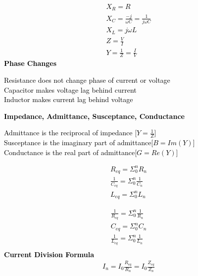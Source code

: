 \documentclass[a4paper,8pt]{extarticle} %
\newcommand{\mybox}[2]{
    \begin{tcolorbox}[colback=lightblue!5!white,colframe=lightblue!75!black,boxsep=1pt,arc=0pt,outer arc=0pt,title={\textcolor{black}{#1}}]
        \textcolor{black}{#2}
    \end{tcolorbox}
}
\begin{document}
\fontsize{7pt}{8pt}\selectfont

\begin{multicols}{2}

\mybox{Impedance}{
    \begin{subequations}
    \begin{align} 
    X_R = R \\
    X_C = \frac{-j}{\omega C} = \frac{1}{j\omega C}\\
    X_L = j\omega L\\
Z = \frac{V}{I}\\
Y = \frac{1}{Z} = \frac{I}{V}
    \end{align}
    \end{subequations}
    \textbf{Phase Changes}
    \begin{center}
        Resistance does not change phase of current or voltage\\
        Capacitor makes voltage lag behind current\\
        Inductor makes current lag behind voltage
    \end{center}
    \textbf{Impedance, Admittance, Susceptance, Conductance}
    \begin{center}
        Admittance is the reciprocal of impedance [$Y = \frac{1}{Z}$]\\
        Susceptance is the imaginary part of admittance[$B = Im(Y)$]\\
        Conductance is the real part of admittance[$G = Re(Y)$]
    \end{center}
}

\mybox{Combination of Elements [Series]}{
    \begin{subequations}
    \begin{align}
    R_{eq} = \Sigma^{n}_{0} R_n\\
    \frac{1}{C_{eq}} = \Sigma^{n}_{0} \frac{1}{C_n}\\
    L_{eq} = \Sigma^{n}_{0} L_n
    \end{align}
    \end{subequations}
}

\mybox{Combination of Elements [Parallel]}{
    \begin{subequations}
    \begin{align}
    \frac{1}{R_{eq}} = \Sigma^{n}_{0} \frac{1}{R_n}\\
    C_{eq} = \Sigma^{n}_{0} C_n\\
    \frac{1}{L_{eq}} = \Sigma^{n}_{0} \frac{1}{L_n}\\
    \end{align}
    \end{subequations}
    \textbf{Current Division Formula}
    \begin{subequations}
    \begin{align}
    I_n = I_0 \frac{R_{eq}}{R_n} = I_0 \frac{Z_{eq}}{Z_n}
    \end{align}
    \end{subequations}
}


\end{multicols}
\end{document}
